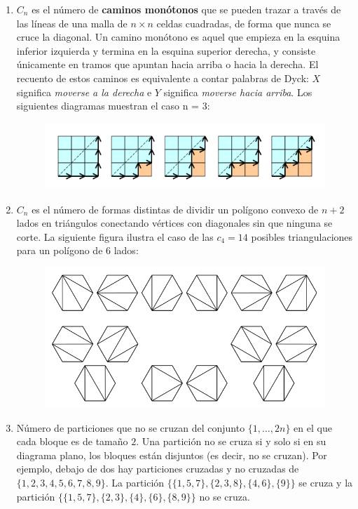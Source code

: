 \begin{enumerate}
	\item $C_n$ es el número de \textbf{caminos monótonos} que se pueden trazar a través de las líneas de una malla de $n \times n$ celdas cuadradas, de forma que nunca se cruce la diagonal. Un camino monótono es aquel que empieza en la esquina inferior izquierda y termina en la esquina superior derecha, y consiste únicamente en tramos que apuntan hacia arriba o hacia la derecha. El recuento de estos caminos es equivalente a contar palabras de Dyck: $X$ significa \emph{moverse a la derecha} e $Y$ significa \emph{moverse hacia arriba}. Los siguientes diagramas muestran el caso n = 3:
	\begin{figure}[h!]
		\centering
		\includegraphics[width=0.7\linewidth]{img/catalan_number_3x3_grid_example}
		\label{fig:catalannumber3x3gridexample}
	\end{figure}
	
	\item $C_n$ es el número de formas distintas de dividir un polígono convexo de $n + 2$ lados en triángulos conectando vértices con diagonales sin que ninguna se corte. La siguiente figura ilustra el caso de las $c_{4} = 14$ posibles triangulaciones para un polígono de $6$ lados:
	\begin{figure}[h!]
		\centering
		\includegraphics[width=0.7\linewidth]{img/catalan-hexagons-example}
		\label{fig:catalan-hexagons-example}
	\end{figure}

	
	

	
	\item Número de particiones que no se cruzan del conjunto $\{1,\dots, 2n\}$ en el que cada bloque es de tamaño $2$. Una partición no se cruza si y solo si en su diagrama plano, los bloques están disjuntos (es decir, no se cruzan). Por ejemplo, debajo de dos hay particiones cruzadas y no cruzadas de $\{1, 2, 3, 4, 5, 6, 7, 8, 9\}$. La partición $\{\{1, 5, 7\}, \{2, 3, 8\}, \{4, 6\}, \{9\}\}$ se cruza y la partición $\{\{1, 5, 7\}, \{2, 3\}, \{4\}, \{6\}, \{8, 9\}\}$ no se cruza.
	

\end{enumerate}
